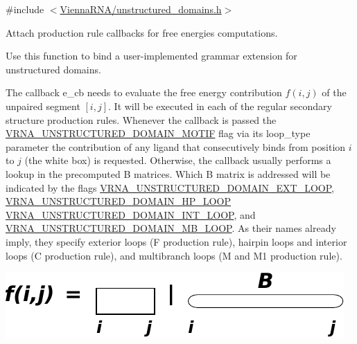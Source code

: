 {\ttfamily \#include $<$\hyperlink{unstructured__domains_8h}{Vienna\+R\+N\+A/unstructured\+\_\+domains.\+h}$>$}



Attach production rule callbacks for free energies computations. 

Use this function to bind a user-\/implemented grammar extension for unstructured domains.

The callback {\ttfamily e\+\_\+cb} needs to evaluate the free energy contribution $f(i,j)$ of the unpaired segment $[i,j]$. It will be executed in each of the regular secondary structure production rules. Whenever the callback is passed the \hyperlink{group__domains__up_gaab12b58d59be76446a9f76fad2fe624c}{V\+R\+N\+A\+\_\+\+U\+N\+S\+T\+R\+U\+C\+T\+U\+R\+E\+D\+\_\+\+D\+O\+M\+A\+I\+N\+\_\+\+M\+O\+T\+IF} flag via its {\ttfamily loop\+\_\+type} parameter the contribution of any ligand that consecutively binds from position $i$ to $j$ (the white box) is requested. Otherwise, the callback usually performs a lookup in the precomputed {\ttfamily B} matrices. Which {\ttfamily B} matrix is addressed will be indicated by the flags \hyperlink{group__domains__up_gaac911374e86236a51bfd42e1f098eaba}{V\+R\+N\+A\+\_\+\+U\+N\+S\+T\+R\+U\+C\+T\+U\+R\+E\+D\+\_\+\+D\+O\+M\+A\+I\+N\+\_\+\+E\+X\+T\+\_\+\+L\+O\+OP}, \hyperlink{group__domains__up_ga23b610ea9564346c45cc1e2bbb62adf7}{V\+R\+N\+A\+\_\+\+U\+N\+S\+T\+R\+U\+C\+T\+U\+R\+E\+D\+\_\+\+D\+O\+M\+A\+I\+N\+\_\+\+H\+P\+\_\+\+L\+O\+OP} \hyperlink{group__domains__up_gac4a0feccd9654c149203200248c2716b}{V\+R\+N\+A\+\_\+\+U\+N\+S\+T\+R\+U\+C\+T\+U\+R\+E\+D\+\_\+\+D\+O\+M\+A\+I\+N\+\_\+\+I\+N\+T\+\_\+\+L\+O\+OP}, and \hyperlink{group__domains__up_ga67b80796655e5227a4ed662bfbe398b0}{V\+R\+N\+A\+\_\+\+U\+N\+S\+T\+R\+U\+C\+T\+U\+R\+E\+D\+\_\+\+D\+O\+M\+A\+I\+N\+\_\+\+M\+B\+\_\+\+L\+O\+OP}. As their names already imply, they specify exterior loops ({\ttfamily F} production rule), hairpin loops and interior loops ({\ttfamily C} production rule), and multibranch loops ({\ttfamily M} and {\ttfamily M1} production rule).

 
\begin{DoxyImageNoCaption}
  \mbox{\includegraphics[width=\textwidth,height=\textheight/2,keepaspectratio=true]{ligands_up_callback}}
\end{DoxyImageNoCaption}


